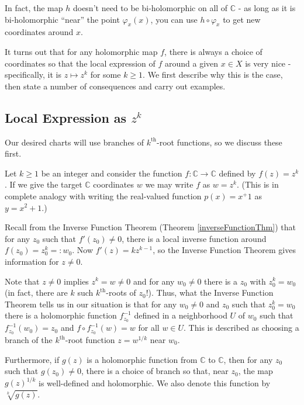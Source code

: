 \documentclass[12pt]{book}%
\theoremstyle{plain}
\theoremstyle{definition}
\theoremstyle{remark}
\def\to{\rightarrow}
\def\bC{{\mathbb{C}}}
\begin{document}
In fact, the map $h$ doesn't need to be bi-holomorphic on all of $\bC$ - as long as it is bi-holomorphic ``near'' the point $\varphi_x(x)$, you can use $h \circ \varphi_x$ to get new coordinates around $x$.


It turns out that for any holomorphic map $f$, there is always a choice of coordinates so that the local expression of $f$ around a given $x\in X$ is very nice - specifically, it is $z \mapsto z^k$ for some $k\geq 1$. We first describe why this is the case, then state a number of consequences and carry out examples.

\subsection{Local Expression as $z^k$}

Our desired charts will use branches of $k^\text{th}$-root functions, so we discuss these first. 

Let $k \geq 1$ be an integer and consider the function $f:\bC \to \bC$ defined by $f(z)=z^k$. If we give the target $\bC$ coordinates $w$ we may write $f$ as $w=z^k$. (This is in complete analogy with writing the real-valued function $p(x) = x^+1$ as $y=x^2+1$.) 

Recall from the Inverse Function Theorem (Theorem \ref{inverseFunctionThm}) that for any $z_0$ such that $f'(z_0) \neq 0$, there is a local inverse function around $f(z_0)=z_0^k=:w_0$. Now $f'(z)=kz^{k-1}$, so the Inverse Function Theorem gives information for $z\neq 0$. 

Note that $z \neq 0$ implies $z^k=w \neq 0$ and for any $w_0 \neq 0$ there is a $z_0$ with $z_0^k=w_0$ (in fact, there are $k$ such $k^\text{th}$-roots of $z_0$!). Thus, what the Inverse Function Theorem tells us in our situation is that for any $w_0 \neq 0$ and $z_0$ such that $z_0^k=w_0$ there is a holomorphic function $f_{z_0}^{-1}$ defined in a neighborhood $U$ of $w_0$ such that $f_{z_0}^{-1}(w_0) = z_0$ and $f \circ f_{z_0}^{-1}(w) = w$ for all $w\in U$. This is described as choosing a branch of the $k^\text{th}$-root function $z=w^{1/k}$ near $w_0$.

\begin{figure}
\label{branchOfKthRootPic}
\end{figure}

Furthermore, if $g(z)$ is a holomorphic function from $\bC$ to $\bC$, then for any $z_0$ such that $g(z_0) \neq 0$, there is a choice of branch so that, near $z_0$, the map $g(z)^{1/k}$ is well-defined and holomorphic. We also denote this function by $\sqrt[k]{g(z)}$.
\end{document}
